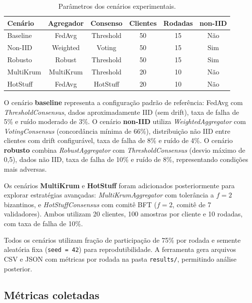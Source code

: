 \documentclass[12pt]{article}
\begin{document}
\begin{table}[!ht]
\centering
\caption{Parâmetros dos cenários experimentais.}\label{tab:cenarios}
\begin{tabular}{lccccc}
\hline
\textbf{Cenário} & \textbf{Agregador} & \textbf{Consenso} & \textbf{Clientes} & \textbf{Rodadas} & \textbf{non-IID} \\
\hline
Baseline    & FedAvg    & Threshold & 50 & 15 & Não \\
Non-IID     & Weighted  & Voting    & 50 & 15 & Sim \\
Robusto     & Robust    & Threshold & 50 & 15 & Sim \\
MultiKrum   & MultiKrum & Threshold & 20 & 10 & Não \\
HotStuff    & FedAvg    & HotStuff  & 20 & 10 & Não \\
\hline
\end{tabular}
\end{table}

O cenário \textbf{baseline} representa a configuração padrão de referência: FedAvg com \textit{ThresholdConsensus}, dados aproximadamente IID (sem drift), taxa de falha de 5\% e ruído moderado de 3\%. O cenário \textbf{non-IID} utiliza \textit{WeightedAggregator} com \textit{VotingConsensus} (concordância mínima de 66\%), distribuição não IID entre clientes com drift configurável, taxa de falha de 8\% e ruído de 4\%. O cenário \textbf{robusto} combina \textit{RobustAggregator} com \textit{ThresholdConsensus} (desvio máximo de 0,5), dados não IID, taxa de falha de 10\% e ruído de 8\%, representando condições mais adversas.

Os cenários \textbf{MultiKrum} e \textbf{HotStuff} foram adicionados posteriormente para explorar estratégias avançadas: \textit{MultiKrumAggregator} com tolerância a $f=2$ bizantinos, e \textit{HotStuffConsensus} com comitê BFT ($f=2$, comitê de 7 validadores). Ambos utilizam 20 clientes, 100 amostras por cliente e 10 rodadas, com taxa de falha de 10\%.

Todos os cenários utilizam fração de participação de 75\% por rodada e semente aleatória fixa (\texttt{seed = 42}) para reprodutibilidade. A ferramenta gera arquivos CSV e JSON com métricas por rodada na pasta \texttt{results/}, permitindo análise posterior.

\subsection{Métricas coletadas}
\end{document}
